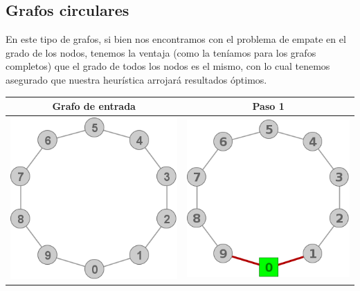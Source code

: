 \subsection{Grafos circulares}
	En este tipo de grafos, si bien nos encontramos con el problema de empate en el 
	grado de los nodos, tenemos la ventaja (como la ten\'iamos para los grafos completos)
	que el grado de todos los nodos es el mismo, con lo cual tenemos asegurado que 
	nuestra heur\'istica arrojar\'a resultados \'optimos.
	\begin{center}
		\begin{tabular}{ |c||c| }
			\hline
			Grafo de entrada & Paso 1 \\
			\hline\hline
			\includegraphics[scale = 0.4]{img/ej3/constructiva_golosa/Circle_st0.png} &
			\includegraphics[scale = 0.4]{img/ej3/constructiva_golosa/Circle_st1.png} \\
			\hline
		\end{tabular}
	\end{center}

